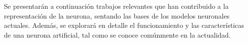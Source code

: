 Se presentarán a continuación trabajos relevantes que han contribuido a la representación de la neurona, sentando las bases de los modelos neuronales actuales. Además, se explorará en detalle el funcionamiento y las características de una neurona artificial, tal como se conoce comúnmente en la actualidad.
